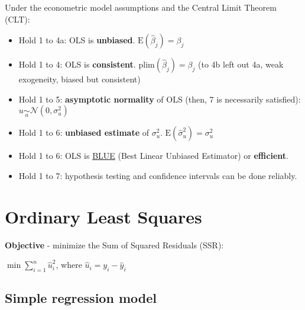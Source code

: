 \documentclass[10pt, a4paper, landscape]{extarticle}
\newcommand{\E}{\mathrm{E}}
\begin{document}
\begin{multicols}{3}
Under the econometric model assumptions and the Central Limit Theorem (CLT):

\begin{itemize}[leftmargin=*]
	\item Hold 1 to 4a: OLS is \textbf{unbiased}. $\E(\hat{\beta}_j) = \beta_j$
	\item Hold 1 to 4: OLS is \textbf{consistent}. $\mathrm{plim}(\hat{\beta}_j) = \beta_j$ (to 4b left out 4a, weak exogeneity, biased but consistent)
	\item Hold 1 to 5: \textbf{asymptotic normality} of OLS (then, 7 is necessarily satisfied): $u \underset{a}{\sim} \mathcal{N}(0, \sigma^2_u)$
	\item Hold 1 to 6: \textbf{unbiased estimate} of $\sigma^2_u$. $\E(\hat{\sigma}^2_u) = \sigma^2_u$
	\item Hold 1 to 6: OLS is \textcolor{blue}{\href{https://www.youtube.com/watch?v=68ugkg9RePc}{BLUE}} (Best Linear Unbiased Estimator) or \textbf{efficient}. 
	\item Hold 1 to 7: hypothesis testing and confidence intervals can be done reliably.
\end{itemize}

\section*{Ordinary Least Squares}

\textbf{Objective} - minimize the Sum of Squared Residuals (SSR):

\begin{center}
	$\min \sum_{i=1}^n \hat{u}_i^2$, where $\hat{u}_i = y_i - \hat{y}_i$
\end{center}

\subsection*{Simple regression model}

\setlength{\multicolsep}{2pt}
\setlength{\columnsep}{-40pt}
\begin{multicols}{2}



\end{multicols}
\end{multicols}
\end{document}
